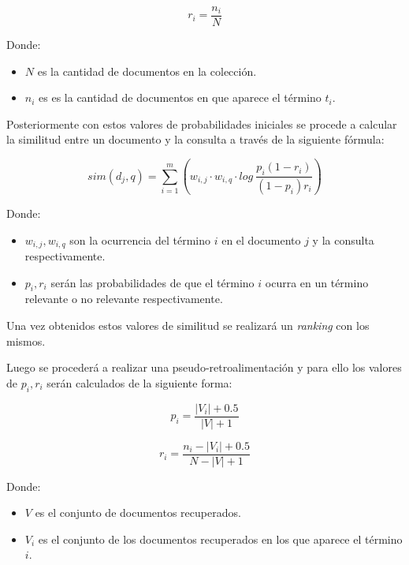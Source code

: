 \documentclass[spanish]{article}
\begin{document}
			\begin{equation}\label{key}
				\displaystyle r_i = \frac{n_i}{N}
			\end{equation}

			Donde: 
			\begin{itemize}
				\item $ N $ es la cantidad de documentos en la colección.

				\item $ n_i $ es es la cantidad de documentos en que aparece el término $ t_i $.
			\end{itemize}

			Posteriormente con estos valores de probabilidades iniciales se procede a calcular la similitud entre un documento y la consulta a través de la siguiente fórmula:
	
			\begin{equation}
				\displaystyle sim(d_j,q) = \sum_{i=1}^m \left( w_{i,j} \cdot w_{i,q} \cdot log \ \frac{p_i (1 - r_i)}{(1- p_i ) r_i} \right)
			\end{equation}

			Donde:
			\begin{itemize}
				\item $ w_{i,j}, w_{i,q} $ son la ocurrencia del término $ i $ en el documento $ j $ y la consulta respectivamente.

				\item $ p_i, r_i $ serán las probabilidades de que el término $ i $ ocurra en un término relevante o no relevante respectivamente.
			\end{itemize}

			Una vez obtenidos estos valores de similitud se realizará un \emph{ranking} con los mismos. 

			Luego se procederá a realizar una pseudo-retroalimentación y para ello los valores de $ p_i, r_i $ serán calculados de la siguiente forma:

			\begin{equation}
				p_i = \frac{|V_i| + 0.5}{|V| + 1}
			\end{equation}
			
			\begin{equation}
				\displaystyle r_i = \frac{n_i - |V_i| + 0.5}{N - |V| + 1}
			\end{equation}
			
			Donde:

			\begin{itemize}
				\item $ V $ es el conjunto de documentos recuperados.
				\item $ V_i $ es el conjunto de los documentos recuperados en los que aparece el término $ i $.
			\end{itemize}
\end{document}
